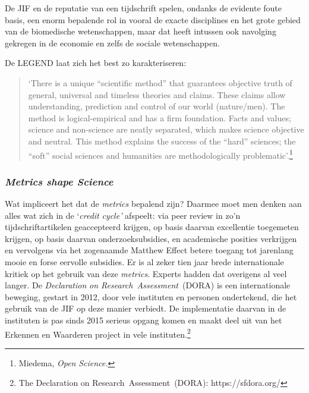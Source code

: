 \documentclass[smallauthor, chapterhaspagenum, nochapterinheader, pagenuminheader,  bigchapnum,medium2, tocpages,  garamond, titleinheader]{jote-book}
\begin{document}
	De JIF en de reputatie van een tijdschrift spelen, ondanks de evidente foute basis, een enorm bepalende rol in vooral de exacte disciplines en het grote gebied van de biomedische wetenschappen, maar dat heeft intussen ook navolging gekregen in de economie en zelfs de sociale wetenschappen.



	De LEGEND laat zich het best zo karakteriseren:

	\begin{quote}
		\itshape

		‘There is a unique “scientific method” that guarantees objective truth of general, universal and timeless theories and claims. These claims allow understanding, prediction and control of our world (nature/men). The method is logical-empirical and has a firm foundation. Facts and values; science and non-science are neatly separated, which makes science objective and neutral. This method explains the success of the “hard” sciences; the “soft” social sciences and humanities are methodologically problematic'.\footnote{Miedema, \emph{Open }\emph{Science}\emph{.}}
	\end{quote}

	\subsubsection{\emph{Metrics shape Science}}



	Wat impliceert het dat de \emph{metrics} bepalend zijn? Daarmee moet men denken aan alles wat zich in de ‘\emph{credit }\emph{cycle}\emph{'} afspeelt: via peer review in zo'n tijdschriftartikelen geaccepteerd krijgen, op basis daarvan excellentie toegemeten krijgen, op basis daarvan onderzoeksubsidies, en academische posities verkrijgen en vervolgens via het zogenaamde Matthew Effect betere toegang tot jarenlang mooie en forse eervolle subsidies. Er is al zeker tien jaar brede internationale kritiek op het gebruik van deze \emph{metrics}. Experts hadden dat overigens al veel langer. De\emph{ }\emph{Declaration}\emph{ on Research Assessment} (DORA) is een internationale beweging, gestart in 2012, door vele instituten en personen ondertekend, die het gebruik van de JIF op deze manier verbiedt. De implementatie daarvan in de instituten is pas sinds 2015 serieus opgang komen en maakt deel uit van het Erkennen en Waarderen project in vele instituten.\footnote{The Declaration on Research Assessment (DORA): https://sfdora.org/}
\end{document}
